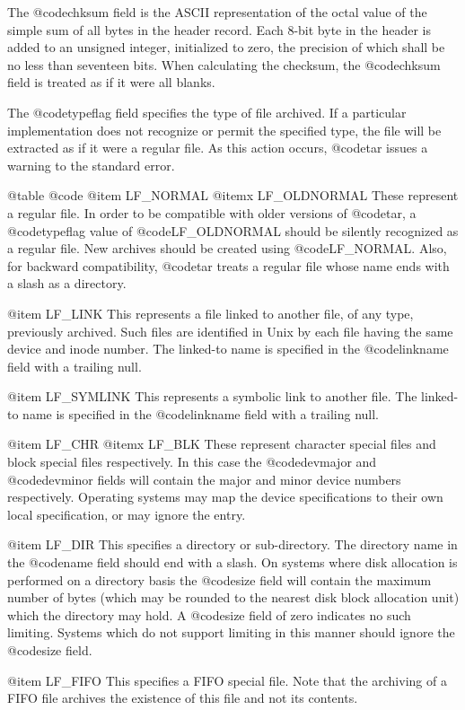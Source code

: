 The @code{chksum} field is the ASCII representation of the octal
value of the simple sum of all bytes in the header record.  Each
8-bit byte in the header is added to an unsigned integer,
initialized to zero, the precision of which shall be no less than
seventeen bits.  When calculating the checksum, the @code{chksum}
field is treated as if it were all blanks.

The @code{typeflag} field specifies the type of file archived.  If a
particular implementation does not recognize or permit the specified
type, the file will be extracted as if it were a regular file.  As
this action occurs, @code{tar} issues a warning to the standard
error.

@table @code
@item LF_NORMAL
@itemx LF_OLDNORMAL
These represent a regular file.  In order to be compatible with
older versions of @code{tar}, a @code{typeflag} value of
@code{LF_OLDNORMAL} should be silently recognized as a regular
file.  New archives should be created using @code{LF_NORMAL}.  Also,
for backward compatibility, @code{tar} treats a regular file whose
name ends with a slash as a directory.

@item LF_LINK
This represents a file linked to another file, of any type,
previously archived.  Such files are identified in Unix by each file
having the same device and inode number.  The linked-to
name is specified in the @code{linkname} field with a trailing null.

@item LF_SYMLINK
This represents a symbolic link to another file.  The linked-to
name is specified in the @code{linkname} field with a trailing null.

@item LF_CHR
@itemx LF_BLK
These represent character special files and block special files
respectively.  In this case the @code{devmajor} and @code{devminor}
fields will contain the major and minor device numbers
respectively.  Operating systems may map the device specifications
to their own local specification, or may ignore the entry.

@item LF_DIR
This specifies a directory or sub-directory.  The directory name in
the @code{name} field should end with a slash.  On systems where
disk allocation is performed on a directory basis the @code{size}
field will contain the maximum number of bytes (which may be rounded
to the nearest disk block allocation unit) which the directory may
hold.  A @code{size} field of zero indicates no such limiting.
Systems which do not support limiting in this manner should ignore
the @code{size} field.

@item LF_FIFO
This specifies a FIFO special file.  Note that the archiving of a
FIFO file archives the existence of this file and not its contents.

